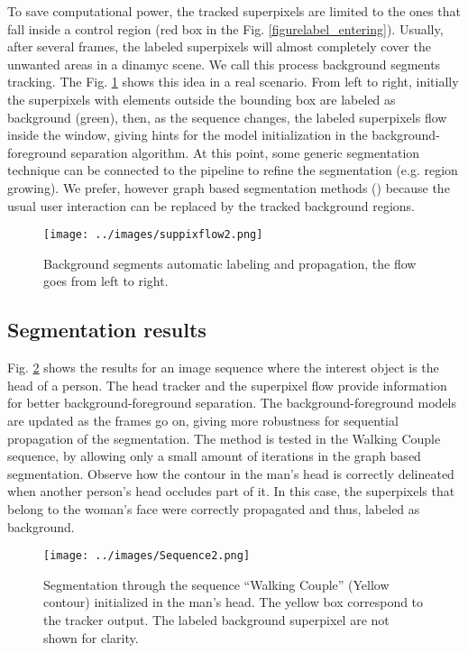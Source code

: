 To save computational power, the tracked superpixels are 
limited to the ones that fall inside a control region (red box in the Fig.  \ref{figurelabel_entering}). Usually, after several frames, 
the labeled superpixels will almost completely cover the unwanted areas in a dinamyc scene. We call this process background segments tracking.  The Fig. \ref{figurelabel_spflow} shows this idea in a real scenario. From left to right, initially the superpixels with 
elements outside the bounding box are labeled as background (green), then, as the sequence changes, the labeled superpixels flow inside the window, giving hints for the model initialization in the background-foreground separation algorithm. 
At this point, some generic segmentation technique can be connected to the pipeline to refine the segmentation (e.g. region growing). We prefer, however graph based segmentation methods (\cite{c18}\cite{c15}) because the usual user interaction can be replaced by the tracked background regions.

   \begin{figure}[thpb]
      \centering
      \texttt{[image: ../images/suppixflow2.png]}
      \caption{Background segments automatic labeling and propagation, the flow goes from left to right.}
      \label{figurelabel_spflow}
   \end{figure}

\subsection{Segmentation results}

Fig. \ref{figurelabel_walking} shows the results for an image sequence where the interest object is the head of a person.
The head tracker and the superpixel flow provide information for better background-foreground separation. The
background-foreground models are updated as the frames go on, giving more robustness for sequential
propagation of the segmentation. The method is tested in the Walking Couple sequence, by allowing only a small amount of iterations in the
graph based segmentation. Observe how the contour in the man's head is correctly delineated when
another person's head occludes part of it. In this case, the superpixels that belong to the woman’s face
were correctly propagated and thus, labeled as background. \\
   \begin{figure}[thpb]
      \centering
      \texttt{[image: ../images/Sequence2.png]}
      \caption{Segmentation through the sequence “Walking
	       Couple” (Yellow contour) initialized in the man’s head. The yellow box correspond to the tracker output.
	        The labeled background superpixel are not shown for clarity.}
      \label{figurelabel_walking}
   \end{figure}

